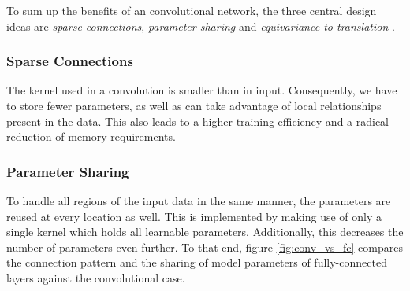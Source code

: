 To sum up the benefits of an convolutional network, the three central design ideas are \textit{sparse connections}, \textit{parameter sharing} and \textit{equivariance to translation} \parencite[p. 336ff.]{deep_learning}.

\subsubsection*{Sparse Connections}
The kernel used in a convolution is smaller than in input. Consequently, we have to store fewer parameters, as well as can take advantage of local relationships present in the data. This also leads to a higher training efficiency and a radical reduction of memory requirements.

\subsubsection*{Parameter Sharing}
To handle all regions of the input data in the same manner, the parameters are reused at every location as well. This is implemented by making use of only a single kernel which holds all learnable parameters.  Additionally, this decreases the number of parameters even further. To that end, figure \ref{fig:conv_vs_fc} compares the connection pattern  and the sharing of model parameters of fully-connected layers against the convolutional case.

